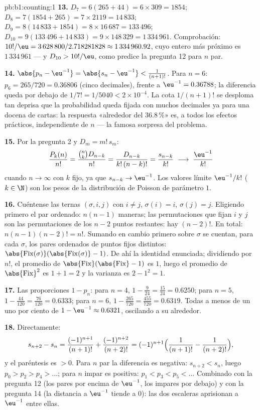\begin{solution}{pb:b1:counting:1}
\textbf{13.} $D_7 = 6(265 + 44) = 6 \times 309 = 1854$;
$D_8 = 7(1854 + 265) = 7 \times 2119 = 14\,833$;
$D_9 = 8(14\,833 + 1854) = 8 \times 16\,687 = 133\,496$;
$D_{10} = 9(133\,496 + 14\,833) = 9 \times 148\,329 = 1\,334\,961$.
Comprobación: $10!/\eu = 3\,628\,800 / 2.718281828 \approx
1\,334\,960.92$, cuyo entero más próximo es $1\,334\,961$ --- y
$D_{10} > 10!/\eu$, como predice la pregunta 12 para $n$ par.

\textbf{14.} $\abs{p_n - \eu^{-1}} = \abs{s_n - \eu^{-1}} <
\frac1{(n+1)!}$. Para $n = 6$: $p_6 = 265/720 = 0.36806$ (cinco
decimales), frente a $\eu^{-1} = 0.36788$; la diferencia queda por
debajo de $1/7! = 1/5040 < 2 \times 10^{-4}$. La cota $1/(n+1)!$ se
desploma tan deprisa que la probabilidad queda fijada con muchos
decimales ya para una docena de cartas: la respuesta «alrededor del
$36.8\,\%$» es, a todos los efectos prácticos, independiente de $n$ ---
la famosa sorpresa del problema.

\textbf{15.} Por la pregunta 2 y $D_m = m!\,s_m$:
\[
\frac{P_k(n)}{n!} = \frac{\binom nk D_{n-k}}{n!}
= \frac{D_{n-k}}{k!\,(n-k)!} = \frac{s_{n-k}}{k!}
\;\longrightarrow\; \frac{\eu^{-1}}{k!}
\]
cuando $n \to \infty$ con $k$ fijo, ya que $s_{n-k} \to \eu^{-1}$. Los
valores límite $\eu^{-1}/k!$ ($k \in \N$) son los pesos de la
distribución de Poisson de parámetro $1$.

\textbf{16.} Cuéntense las ternas $(\sigma, i, j)$ con $i \neq j$,
$\sigma(i) = i$, $\sigma(j) = j$. Eligiendo primero el par ordenado:
$n(n-1)$ maneras; las permutaciones que fijan $i$ y $j$ son las
permutaciones de los $n - 2$ puntos restantes: hay $(n-2)!$. En total:
$n(n-1)(n-2)! = n!$. Sumando en cambio primero sobre $\sigma$ se cuentan,
para cada $\sigma$, los pares ordenados de puntos fijos distintos:
$\abs{\mathrm{Fix}(\sigma)}(\abs{\mathrm{Fix}(\sigma)}-1)$. De ahí la
identidad enunciada; dividiendo por $n!$, el promedio de
$\abs{\mathrm{Fix}}(\abs{\mathrm{Fix}} - 1)$ es $1$, luego el promedio
de $\abs{\mathrm{Fix}}^2$ es $1 + 1 = 2$ y la varianza es
$2 - 1^2 = 1$.

\textbf{17.} Las proporciones $1 - p_n$: para $n = 4$,
$1 - \frac 9{24} = \frac{15}{24} = 0.6250$; para $n = 5$,
$1 - \frac{44}{120} = \frac{76}{120} = 0.6333$; para $n = 6$,
$1 - \frac{265}{720} = \frac{455}{720} = 0.6319$. Todas a menos de un
uno por ciento de $1 - \eu^{-1} \approx 0.6321$, oscilando a su
alrededor.

\textbf{18.} Directamente:
\[
s_{n+2} - s_n = \frac{(-1)^{n+1}}{(n+1)!} +
\frac{(-1)^{n+2}}{(n+2)!}
= (-1)^{n+1}\Bigl(\frac1{(n+1)!} - \frac1{(n+2)!}\Bigr),
\]
y el paréntesis es $> 0$. Para $n$ par la diferencia es negativa:
$s_{n+2} < s_n$, luego $p_0 > p_2 > p_4 > \dots$; para $n$ impar es
positiva: $p_1 < p_3 < p_5 < \dots$ Combinado con la pregunta 12 (los
pares por encima de $\eu^{-1}$, los impares por debajo) y con la
pregunta 14 (la distancia a $\eu^{-1}$ tiende a $0$): las dos escaleras
aprisionan a $\eu^{-1}$ entre ellas.


\end{solution}
